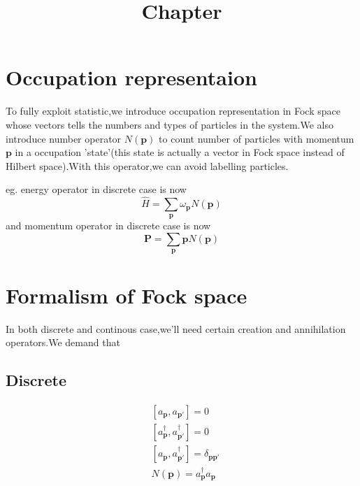 \documentclass[a4paper]{article}
\begin{document}
\title{Chapter}
\date{ }
\maketitle
\section{Occupation representaion}
To fully exploit statistic,we introduce occupation representation in Fock space whose vectors tells the numbers and types of particles in the system.We also introduce number operator $N(\bm{p})$ to count number of particles with momentum $\bm{p}$ in a occupation 'state'(this state is actually a vector in Fock space instead of Hilbert space).With this operator,we can avoid labelling particles.
\par eg. energy operator in discrete case is now $$\hat{H}=\underset{\bm{p}}{\sum}\omega_{\bm{p}}N(\bm{p})$$and momentum operator in discrete case is now $$\bm{P}=\underset{\bm{p}}{\sum}\bm{p}N(\bm{p})$$
\section{Formalism of Fock space}
In both discrete and continous case,we'll need certain creation and annihilation operators.We demand that
\subsection{Discrete}
\begin{align*}
	&[a_{\bm{p}},a_{\bm{p}'}]=0\\
	&[a^{\dagger}_{\bm{p}},a^{\dagger}_{\bm{p}'}]=0\\
	&[a_{\bm{p}},a^{\dagger}_{\bm{p}'}]=\delta_{\bm{p}\bm{p}'}\\
	&N(\bm{p})=a^{\dagger}_{\bm{p}}a_{\bm{p}}
\end{align*}
\end{document}
